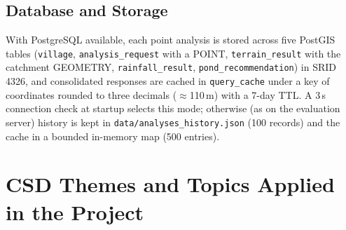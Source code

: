 \documentclass[manuscript,screen,review]{acmart}
\begin{document}
\subsection{Database and Storage}
With PostgreSQL available, each point analysis is stored across five PostGIS tables (\texttt{village}, \texttt{analysis\_request} with a POINT, \texttt{terrain\_result} with the catchment GEOMETRY, \texttt{rainfall\_result}, \texttt{pond\_recommendation}) in SRID 4326, and consolidated responses are cached in \texttt{query\_cache} under a key of coordinates rounded to three decimals ($\approx$110\,m) with a 7-day TTL. A 3\,s connection check at startup selects this mode; otherwise (as on the evaluation server) history is kept in \texttt{data/analyses\_history.json} (100 records) and the cache in a bounded in-memory map (500 entries).

\section{CSD Themes and Topics Applied in the Project}
\label{sec:csd-themes}
\end{document}
